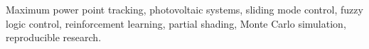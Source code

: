 \documentclass[journal]{IEEEtran}
\begin{document}
\begin{IEEEkeywords}
Maximum power point tracking, photovoltaic systems, sliding mode control,
fuzzy logic control, reinforcement learning, partial shading, Monte Carlo
simulation, reproducible research.
\end{IEEEkeywords}












\end{document}
